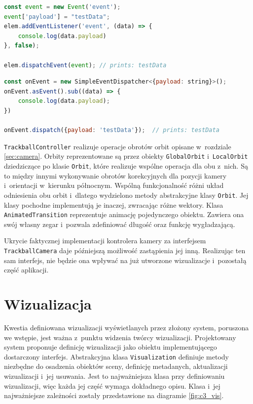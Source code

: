 \begin{lstlisting}[language=javascript, label={lst:events_1}, caption={Obsługa zdarzenia w~języku JavaScript}]
const event = new Event('event');
event['payload'] = "testData";
elem.addEventListener('event', (data) => {
    console.log(data.payload) 
}, false);

elem.dispatchEvent(event); // prints: testData
\end{lstlisting}

\begin{lstlisting}[language=javascript, label={lst:events_2}, caption={Obsługa zdarzenia w~języku TypeScript z~wykorzystaniem biblioteki \texttt{strongly-typed-events}}]
const onEvent = new SimpleEventDispatcher<{payload: string}>();
onEvent.asEvent().sub((data) => {
    console.log(data.payload); 
})

onEvent.dispatch({payload: 'testData'});  // prints: testData
\end{lstlisting}

\texttt{TrackballController} realizuje operacje obrotów orbit opisane w~rozdziale \ref{sec:camera}. Orbity reprezentowane są przez obiekty \texttt{GlobalOrbit} i~\texttt{LocalOrbit} dziedziczące po klasie \texttt{Orbit}, które realizuje wspólne operacja dla obu z~nich. Są to między innymi wykonywanie obrotów korekcyjnych dla pozycji kamery i~orientacji w~kierunku północnym. Wspólną funkcjonalność różni układ odniesienia obu orbit i~dlatego wydzielono metody abstrakcyjne klasy \texttt{Orbit}. Jej klasy pochodne implementują je inaczej, zwracając różne wektory. Klasa \texttt{AnimatedTransition} reprezentuje animację pojedynczego obiektu. Zawiera ona swój własny zegar i~pozwala zdefiniować długość oraz funkcję wygładzającą.

Ukrycie faktycznej implementacji kontrolera kamery za interfejsem \texttt{TrackballCamera} daje późniejszą możliwość zastąpienia jej inną. Realizując ten sam interfejs, nie będzie ona wpływać na już utworzone wizualizacje i~pozostałą część aplikacji. 

\section{Wizualizacja}

Kwestia definiowana wizualizacji wyświetlanych przez złożony system, poruszona we wstępie, jest ważna z~punktu widzenia twórcy wizualizacji. Projektowany system proponuje definicję wizualizacji jako obiektu implementującego dostarczony interfejs. Abstrakcyjna klasa \texttt{Visualization} definiuje metody niezbędne do osadzenia obiektów sceny, definicję metadanych, aktualizacji wizualizacji i~jej usuwania. Jest to najważniejsza klasa przy definiowaniu wizualizacji, więc każda jej część wymaga dokładnego opisu. Klasa i~jej najważniejsze zależności zostały przedstawione na diagramie \ref{fig:c3_vis}.

